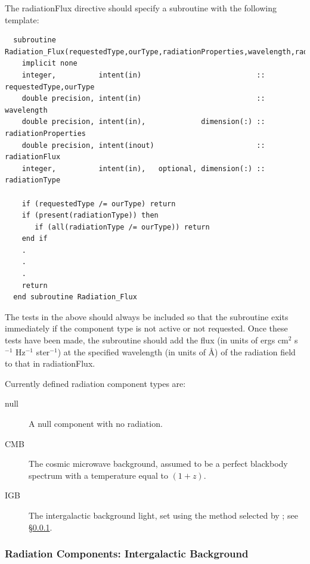 The {\normalfont \ttfamily radiationFlux} directive should specify a subroutine with the following template:
\begin{verbatim}
  subroutine Radiation_Flux(requestedType,ourType,radiationProperties,wavelength,radiationFlux,radiationType)
    implicit none
    integer,          intent(in)                           :: requestedType,ourType
    double precision, intent(in)                           :: wavelength
    double precision, intent(in),             dimension(:) :: radiationProperties
    double precision, intent(inout)                        :: radiationFlux
    integer,          intent(in),   optional, dimension(:) :: radiationType

    if (requestedType /= ourType) return
    if (present(radiationType)) then
       if (all(radiationType /= ourType)) return
    end if
    .
    .
    .
    return
  end subroutine Radiation_Flux
\end{verbatim}
The tests in the above should always be included so that the subroutine exits immediately if the component type is not active or not requested. Once these tests have been made, the subroutine should add the flux (in units of ergs cm$^2$ s$^{-1}$ Hz$^{-1}$ ster$^{-1}$) at the specified {\normalfont \ttfamily wavelength} (in units of \AA) of the radiation field to that in {\normalfont \ttfamily radiationFlux}.

Currently defined radiation component types are:
\begin{description}
 \item [{\normalfont \ttfamily null}] A null component with no radiation.
 \item [{\normalfont \ttfamily CMB}] The cosmic microwave background, assumed to be a perfect blackbody spectrum with a temperature equal to {\normalfont \ttfamily [T\_CMB]}$(1+z)$.
 \item [{\normalfont \ttfamily IGB}] The intergalactic background light, set using the method selected by {\normalfont \ttfamily [radiationIntergalacticBackgroundMethod]; see \S\ref{sec:radiationIGB}}.
\end{description}

\subsubsection{Radiation Components: Intergalactic Background}\label{sec:radiationIGB}

